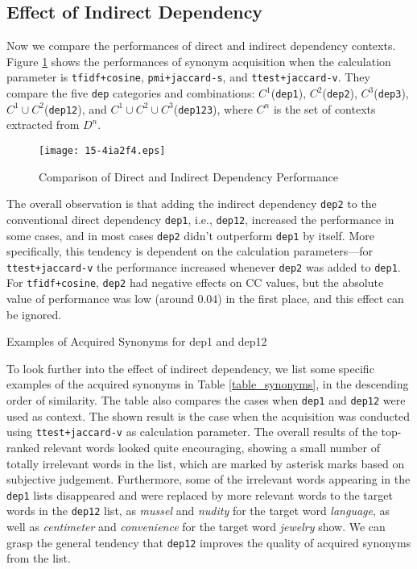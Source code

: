 \documentclass[english]{jnlp_1.4}
\begin{document}
\subsection{Effect of Indirect Dependency}

Now we compare the performances of direct and indirect dependency
contexts. Figure \ref{fig_exp1_tw} shows the performances of synonym
acquisition when the calculation parameter is \verb|tfidf+cosine|,
\verb|pmi+jaccard-s|, and \verb|ttest+jaccard-v|. They compare the
five \verb|dep| categories and combinations: $C^1$(\verb|dep1|),
$C^2$(\verb|dep2|), $C^3$(\verb|dep3|), $C^1\cup C^2$(\verb|dep12|),
and $C^1\cup C^2\cup C^3$(\verb|dep123|), where $C^n$ is the set of
contexts extracted from $D^n$. 

\begin{figure}[t]
\begin{center}
\texttt{[image: 15-4ia2f4.eps]}
\caption{Comparison of Direct and Indirect Dependency Performance}
\label{fig_exp1_tw}
\end{center}
\end{figure}

The overall observation is that adding the indirect dependency
\verb|dep2| to the conventional direct dependency \verb|dep1|,
i.e., \verb|dep12|, increased the performance in some cases, and in
most cases \verb|dep2| didn't outperform \verb|dep1| by itself. More
specifically, this tendency is dependent on the calculation 
parameters---for \verb|ttest+jaccard-v| the performance increased whenever
\verb|dep2| was added to \verb|dep1|. For \verb|tfidf+cosine|,
\verb|dep2| had negative effects on CC values, but the absolute value
of performance was low (around 0.04) in the first place, and this
effect can be ignored.

\begin{table}[b]
\caption{Examples of Acquired Synonyms for dep1 and dep12}
\label{table_synonyms}
\begin{center}

\end{center}
\end{table}

To look further into the effect of indirect dependency, we list some
specific examples of the acquired synonyms in Table
\ref{table_synonyms}, in the descending order of similarity. The table
also compares the cases when \verb|dep1| and \verb|dep12| were used as
context. The shown result is the case when the acquisition was
conducted using \verb|ttest+jaccard-v| as calculation parameter. The
overall results of the top-ranked relevant words looked quite
encouraging, showing a small number of totally irrelevant words in the
list, which are marked by asterisk marks based on subjective
judgement. Furthermore, some of the irrelevant words appearing in the
\verb|dep1| lists disappeared and were replaced by more relevant words
to the target words in the \verb|dep12| list, as {\em mussel} and {\em
  nudity} for the target word {\em language}, as well as {\em
  centimeter} and {\em convenience} for the target word {\em jewelry}
show. We can grasp the general tendency that \verb|dep12| improves the
quality of acquired synonyms from the list.
\end{document}

